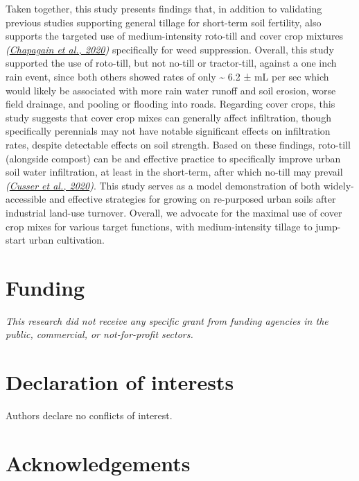 \documentclass[
  12pt,
]{article}
\begin{document}
Taken together, this study presents findings that, in addition to validating previous studies supporting general tillage for short-term soil fertility, also supports the targeted use of medium-intensity roto-till and cover crop mixtures \emph{(\protect\hyperlink{ref-chapagain20}{Chapagain et al., 2020})} specifically for weed suppression.
Overall, this study supported the use of roto-till, but not no-till or tractor-till, against a one inch rain event, since both others showed rates of only
\textasciitilde{} 6.2 ±
mL per sec
which would likely be associated with more rain water runoff and soil erosion, worse field drainage, and pooling or flooding into roads.
Regarding cover crops, this study suggests that cover crop mixes can generally affect infiltration, though specifically perennials may not have notable significant effects on infiltration rates, despite detectable effects on soil strength.
Based on these findings, roto-till (alongside compost) can be and effective practice to specifically improve urban soil water infiltration, at least in the short-term, after which no-till may prevail \emph{(\protect\hyperlink{ref-cusser20}{Cusser et al., 2020})}.
This study serves as a model demonstration of both widely-accessible and effective strategies for growing on re-purposed urban soils after industrial land-use turnover.
Overall, we advocate for the maximal use of cover crop mixes for various target functions, with medium-intensity tillage to jump-start urban cultivation.

\newpage

\hypertarget{funding}{%
\section*{Funding}\label{funding}}

\emph{This research did not receive any specific grant from funding agencies in the public, commercial, or not-for-profit sectors.}

\hypertarget{declaration-of-interests}{%
\section*{Declaration of interests}\label{declaration-of-interests}}

Authors declare no conflicts of interest.

\hypertarget{acknowledgements}{%
\section*{Acknowledgements}\label{acknowledgements}}
\end{document}

